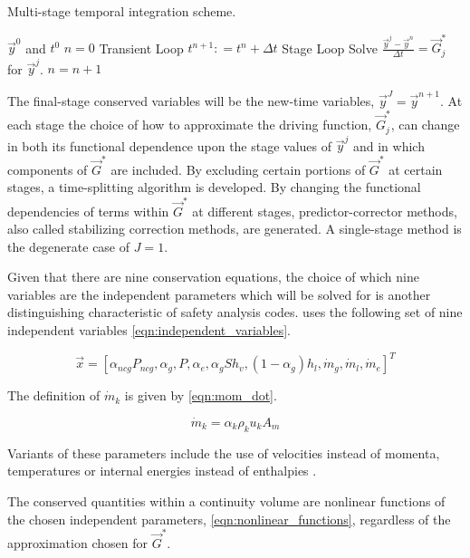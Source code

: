 \begin{algo}[H]
\caption{Multi-stage temporal integration scheme.}
\label{alg:single_stage_temporal}
\setlength{\baselineskip}{0.625\baselineskip}
\begin{algorithmic}[1]
\Require $\vec{y}^{0}$ and $t^{0}$
\Set $n = 0$
\Loop \; Transient Loop
    \State $t^{n+1} : = t^{n} + \Delta t$
     \; Stage Loop
		\BlackBox Solve $\displaystyle \frac{\vec{y}^{j} - \vec{y}^{n}}{\Delta t} =  \vec{G}_{j}^{*}$ for $\vec{y}^{j}$.
	\EndFor
	\State $n = n + 1$
\EndLoop
\end{algorithmic}
\end{algo}

The final-stage conserved variables will be the new-time variables, $\vec{y}^{J} = \vec{y}^{n+1}$. 
At each stage the choice of how to approximate the driving function, $\vec{G}_{j}^{*}$, can change in both its functional dependence upon the stage values of $\vec{y}^{j}$ and in which components of $\vec{G}^{*}$ are included.
By excluding certain portions of $\vec{G}^{*}$ at certain stages, a time-splitting algorithm is developed.
By changing the functional dependencies of terms within $\vec{G}^{*}$ at different stages, predictor-corrector methods, also called stabilizing correction methods, are generated. 
A single-stage method is the degenerate case of $J = 1$.

Given that there are nine conservation equations, the choice of which nine variables are the independent parameters which will be solved for is another distinguishing characteristic of safety analysis codes.
\cobra{} uses the following set of nine independent variables \eqref{eqn:independent_variables}.

\begin{equation}
\label{eqn:independent_variables}
\vec{x} = [\alpha_{ncg}P_{ncg}, \alpha_g, P, \alpha_e, \alpha_gS h_v, (1 - \alpha_g) h_l, \dot{m}_g, \dot{m}_l, \dot{m}_e]^{T}
\end{equation}

The definition of $\dot{m}_k$ is given by \eqref{eqn:mom_dot}.

\begin{equation}
\label{eqn:mom_dot}
\dot{m}_k = \alpha_k \rho_k u_k A_m
\end{equation}

Variants of these parameters include the use of velocities instead of momenta, temperatures or internal energies instead of enthalpies \cite{RELAP, TRACE}.

The conserved quantities within a continuity volume are nonlinear functions of the chosen independent parameters, \eqref{eqn:nonlinear_functions}, regardless of the approximation chosen for $\vec{G}^{*}$.

